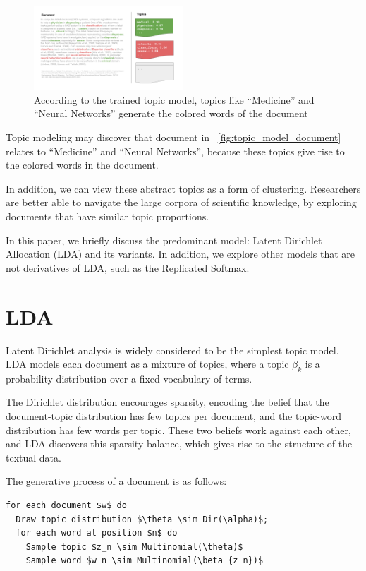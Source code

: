 \documentclass[letterpaper]{article}
\begin{document}
\begin{figure}[ht]
  \centering
  \includegraphics[width=0.5\textwidth]{topic_models.png}
  \caption{\label{fig:topic_model_document} According to the trained
    topic model, topics like ``Medicine'' and ``Neural Networks''
    generate the colored words of the document}
\end{figure}


Topic modeling may discover that document in
~\autoref{fig:topic_model_document} relates to ``Medicine'' and
``Neural Networks'', because these topics give rise to the colored
words in the document.

In addition, we can view these abstract topics as a form of clustering.
Researchers are better able to navigate the large corpora of
scientific knowledge, by exploring documents that have similar topic
proportions.

In this paper, we briefly discuss the predominant model: Latent
Dirichlet Allocation (LDA) and its variants. In addition, we explore
other models that are not derivatives of LDA, such as the Replicated
Softmax.

\section{LDA}
Latent Dirichlet analysis is widely considered to be the simplest
topic model. LDA models each document as a mixture of topics, where a
topic $\beta_k$ is a probability distribution over a fixed vocabulary
of terms.

The Dirichlet distribution encourages sparsity, encoding the belief
that the document-topic distribution has few topics per document, and
the topic-word distribution has few words per topic. These two beliefs
work against each other, and LDA discovers this sparsity balance,
which gives rise to the structure of the textual data.

The generative process of a document is as follows:

\begin{lstlisting}[mathescape=true]
for each document $w$ do
  Draw topic distribution $\theta \sim Dir(\alpha)$;
  for each word at position $n$ do
    Sample topic $z_n \sim Multinomial(\theta)$
    Sample word $w_n \sim Multinomial(\beta_{z_n})$
\end{lstlisting}
\end{document}
